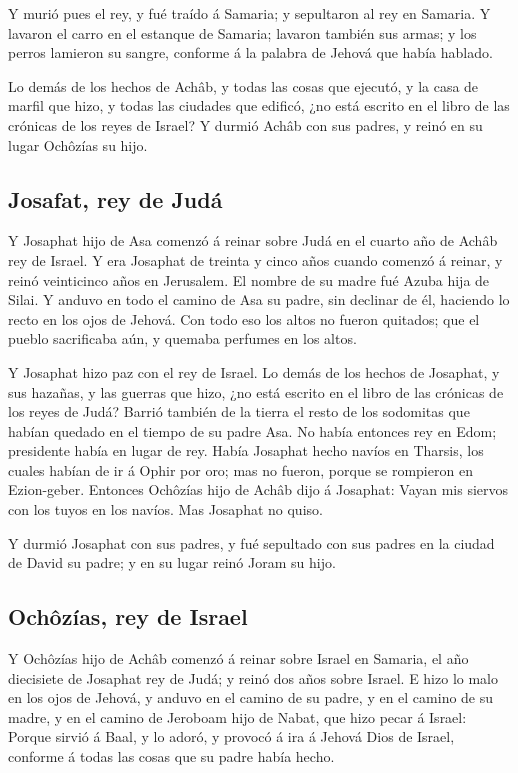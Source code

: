  Y murió pues el rey, y fué traído á Samaria; y
sepultaron al rey en Samaria.  Y lavaron el carro en el
estanque de Samaria; lavaron también sus armas; y los perros lamieron su
sangre, conforme á la palabra de Jehová que había hablado.

 Lo demás de los hechos de Achâb, y todas las cosas que
ejecutó, y la casa de marfil que hizo, y todas las ciudades que edificó,
¿no está escrito en el libro de las crónicas de los reyes de Israel?
 Y durmió Achâb con sus padres, y reinó en su lugar
Ochôzías su hijo.

\hypertarget{josafat-rey-de-juduxe1}{%
\subsection{Josafat, rey de Judá}\label{josafat-rey-de-juduxe1}}

 Y Josaphat hijo de Asa comenzó á reinar sobre Judá en el
cuarto año de Achâb rey de Israel.  Y era Josaphat de
treinta y cinco años cuando comenzó á reinar, y reinó veinticinco años
en Jerusalem. El nombre de su madre fué Azuba hija de Silai.
 Y anduvo en todo el camino de Asa su padre, sin declinar
de él, haciendo lo recto en los ojos de Jehová.  Con todo
eso los altos no fueron quitados; que el pueblo sacrificaba aún, y
quemaba perfumes en los altos.

 Y Josaphat hizo paz con el rey de Israel.
 Lo demás de los hechos de Josaphat, y sus hazañas, y las
guerras que hizo, ¿no está escrito en el libro de las crónicas de los
reyes de Judá?  Barrió también de la tierra el resto de
los sodomitas que habían quedado en el tiempo de su padre Asa.
 No había entonces rey en Edom; presidente había en lugar
de rey.  Había Josaphat hecho navíos en Tharsis, los
cuales habían de ir á Ophir por oro; mas no fueron, porque se rompieron
en Ezion-geber.  Entonces Ochôzías hijo de Achâb dijo á
Josaphat: Vayan mis siervos con los tuyos en los navíos. Mas Josaphat no
quiso.

 Y durmió Josaphat con sus padres, y fué sepultado con
sus padres en la ciudad de David su padre; y en su lugar reinó Joram su
hijo.

\hypertarget{ochuxf4zuxedas-rey-de-israel}{%
\subsection{Ochôzías, rey de
Israel}\label{ochuxf4zuxedas-rey-de-israel}}

 Y Ochôzías hijo de Achâb comenzó á reinar sobre Israel
en Samaria, el año diecisiete de Josaphat rey de Judá; y reinó dos años
sobre Israel.  E hizo lo malo en los ojos de Jehová, y
anduvo en el camino de su padre, y en el camino de su madre, y en el
camino de Jeroboam hijo de Nabat, que hizo pecar á Israel: Porque sirvió
á Baal, y lo adoró, y provocó á ira á Jehová Dios de Israel, conforme á
todas las cosas que su padre había hecho.
